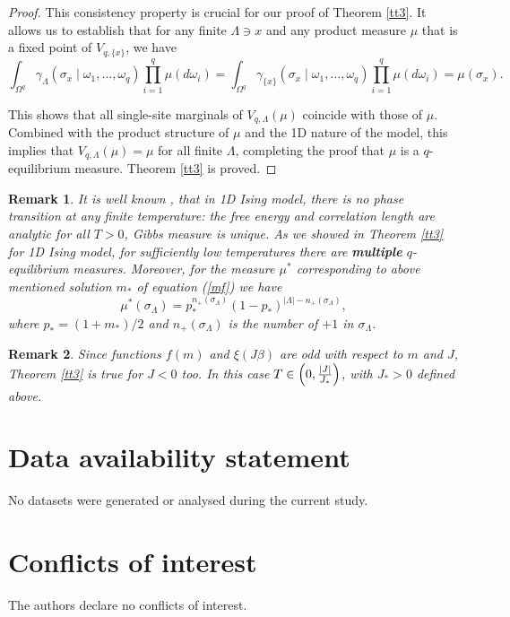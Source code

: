 \documentclass[11pt,reqno]{amsart}
\newtheorem{rk}{Remark}
\numberwithin{equation}{section} \setcounter{tocdepth}{1}
\begin{document}
\begin{proof}
This consistency property is crucial for our proof of Theorem \ref{tt3}. 
It allows us to establish that for any finite $\Lambda \ni x$ and any product 
measure $\mu$ that is a fixed point of $V_{q,\{x\}}$, we have
$$
\int_{\Omega^q} \gamma_\Lambda(\sigma_x \mid \omega_1, \dots, \omega_q) \prod_{i=1}^q \mu(d\omega_i) = \int_{\Omega^q} \gamma_{\{x\}}(\sigma_x \mid \omega_1, \dots, \omega_q) \prod_{i=1}^q \mu(d\omega_i) = \mu(\sigma_x).
$$

This shows that all single-site marginals of $V_{q,\Lambda}(\mu)$ coincide with those of $\mu$. Combined with the product structure of $\mu$ and the 1D nature of the model, this implies that $V_{q,\Lambda}(\mu) = \mu$ for all finite $\Lambda$, completing the proof that $\mu$ is a $q$-equilibrium measure. Theorem \ref{tt3} is proved.
\end{proof}


\begin{rk} It is well known \cite{Ba}, \cite{Ge} that in 1D Ising model, 
there is no phase transition at any finite temperature: the free energy and correlation 
length are analytic for all $T>0$, Gibbs measure is unique. As we showed in Theorem \ref{tt3} for 1D 
Ising model, for sufficiently low temperatures there are \textbf{multiple} $q$-equilibrium measures. 
Moreover, for the measure $\mu^*$ corresponding to above mentioned 
solution $m_*$ of equation (\ref{mf})  we have 
$$\mu^*(\sigma_\Lambda)=p_*^{n_+(\sigma_\Lambda)}(1-p_*)^{|\Lambda|-n_+(\sigma_\Lambda)},$$
where $p_*=(1+m_*)/2$ and 
  $n_+(\sigma_\Lambda)$ is the number of $ +1$ in $\sigma_\Lambda$.
  \end{rk}
  \begin{rk} Since functions $f(m)$ and $\xi(J\beta)$ are odd with respect to $m$ and $J$, Theorem \ref{tt3} is true for $J<0$ too. In this case $T \in \left(0, {|J|\over J_*}\right)$, with $J_*>0$ defined above. 
  \end{rk}

\section*{Data availability statement}
No datasets were generated or analysed during the current study.  

\section*{Conflicts of interest} The authors declare no conflicts of interest.
\end{document}
